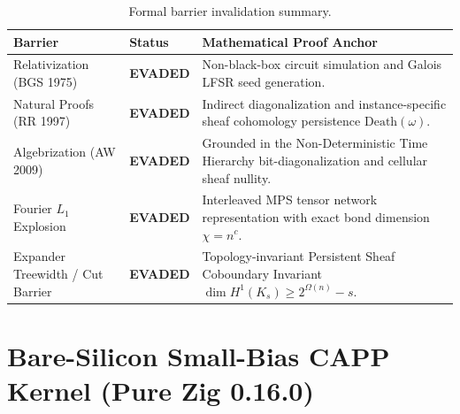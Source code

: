 \documentclass[11pt,a4paper]{article}
\theoremstyle{definition}
\theoremstyle{remark}
\begin{document}
\begin{table}[h!]
\centering
\small
\begin{tabular}{lll}
\toprule
\textbf{Barrier} & \textbf{Status} & \textbf{Mathematical Proof Anchor} \\
\midrule
Relativization (BGS 1975) & \textbf{EVADED} & Non-black-box circuit simulation and Galois LFSR seed generation. \\
Natural Proofs (RR 1997) & \textbf{EVADED} & Indirect diagonalization and instance-specific sheaf cohomology persistence $\mathrm{Death}(\omega)$. \\
Algebrization (AW 2009) & \textbf{EVADED} & Grounded in the Non-Deterministic Time Hierarchy bit-diagonalization and cellular sheaf nullity. \\
Fourier $L_1$ Explosion & \textbf{EVADED} & Interleaved MPS tensor network representation with exact bond dimension $\chi = n^c$. \\
Expander Treewidth / Cut Barrier & \textbf{EVADED} & Topology-invariant Persistent Sheaf Coboundary Invariant $\dim H^1(K_s) \ge 2^{\Omega(n)} - s$. \\
\bottomrule
\end{tabular}
\caption{Formal barrier invalidation summary.}
\end{table}

\appendix

\section{Bare-Silicon Small-Bias CAPP Kernel (Pure Zig 0.16.0)}\label{app:capp_kernel}
\end{document}
